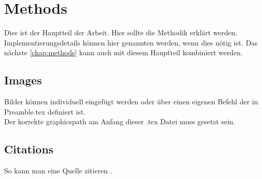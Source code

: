 \graphicspath{{Chapter/Figs/methods/}}
\chapter{Methods}
\label{chap:methods}

Dies ist der Hauptteil der Arbeit.
Hier sollte die Methodik erklärt werden.
Implementierungsdetails können hier genannten werden, wenn dies nötig ist.
Das nächste \autoref{chap:methods} kann auch mit diesem Hauptteil kombiniert werden.


\section{Images}

Bilder können individuell eingefügt werden oder über einen eigenen Befehl der in Preamble.tex definiert ist.
\\
Der korrekte graphicspath am Anfang dieser .tex Datei muss gesetzt sein.


\section{Citations}


So kann man eine Quelle zitieren \cite{dropout}.
